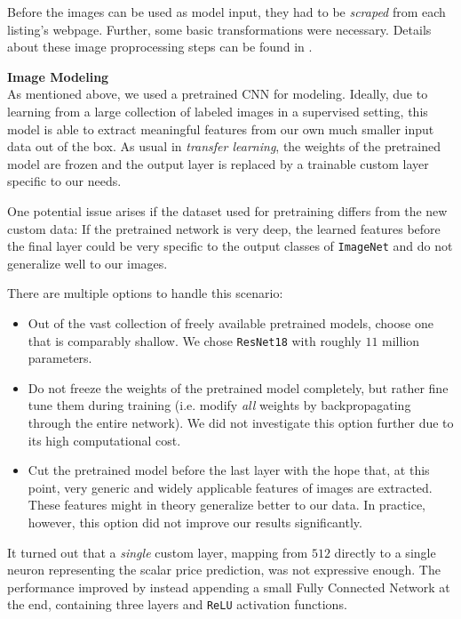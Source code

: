 Before the images can be used as model input, they had to be \emph{scraped} from each listing's webpage.
Further, some basic transformations were necessary.
Details about these image proprocessing steps can be found in .


\textbf{Image Modeling} \\
As mentioned above, we used a pretrained CNN for modeling.
Ideally, due to learning from a large collection of labeled images in a supervised setting, this model is able to extract meaningful features from our own much smaller input data out of the box.
As usual in \emph{transfer learning}, the weights of the pretrained model are frozen and the output layer is replaced by a trainable custom layer specific to our needs.

One potential issue arises if the dataset used for pretraining differs from the new custom data:
If the pretrained network is very deep, the learned features before the final layer could be very specific to the output classes of \texttt{ImageNet} and do not generalize well to our images.

There are multiple options to handle this scenario:
\begin{itemize}
  \item Out of the vast collection of freely available pretrained models, choose one that is comparably shallow.
        We chose \texttt{ResNet18} with roughly $11$ million parameters.
  \item Do not freeze the weights of the pretrained model completely, but rather fine tune them during training (i.e. modify \emph{all} weights by backpropagating through the entire network).
        We did not investigate this option further due to its high computational cost.
  \item Cut the pretrained model before the last layer with the hope that, at this point, very generic and widely applicable features of images are extracted.
        These features might in theory generalize better to our data.
        In practice, however, this option did not improve our results significantly.
\end{itemize}

It turned out that a \emph{single} custom layer, mapping from $512$ directly to a single neuron representing the scalar price prediction, was not expressive enough.
The performance improved by instead appending a small Fully Connected Network at the end, containing three layers and \texttt{ReLU} activation functions.

